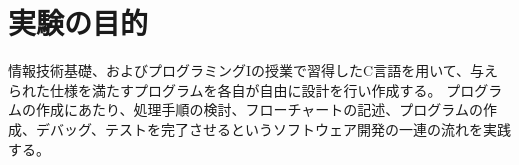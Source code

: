 

\section{実験の目的}
  情報技術基礎、およびプログラミングIの授業で習得したC言語を用いて、与えられた仕様を満たすプログラムを各自が自由に設計を行い作成する。
  プログラムの作成にあたり、処理手順の検討、フローチャートの記述、プログラムの作成、デバッグ、テストを完了させるというソフトウェア開発の一連の流れを実践する。


